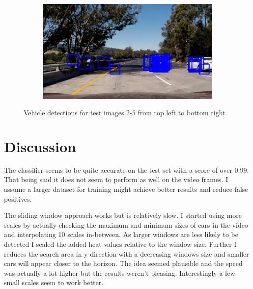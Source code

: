 \documentclass[a4paper, 11pt, DIV=14]{scrartcl}
\begin{document}
\begin{figure}[h]
\begin{subfigure}{0.45\textwidth}
    \end{subfigure}\quad
    \begin{subfigure}{0.45\textwidth}
        \includegraphics[width=\textwidth]{output_images/test5.jpg}
    \end{subfigure}
    \caption{Vehicle detections for test images 2-5 from top left to bottom right}  
    \label{fig:test_vehicles}
\end{figure}
\section{Discussion}
The classifier seems to be quite accurate on the test set with a score of over 0.99. That being said it does not seem to perform as well on the video frames. I assume a larger dataset for training might achieve better results and reduce false positives.

The sliding window approach works but is relatively slow. I started using more scales by actually checking the maximum and minimum sizes of cars in the video and interpolating 10 scales in-between. As larger windows are less likely to be detected I scaled the added heat values relative to the window size. Further I reduces the search area in y-direction with a decreasing windows size and smaller cars will appear closer to the horizon. The idea seemed plausible and the speed was actually a lot higher but the results weren't pleasing. Interestingly a few small scales seem to work better.
\end{document}
